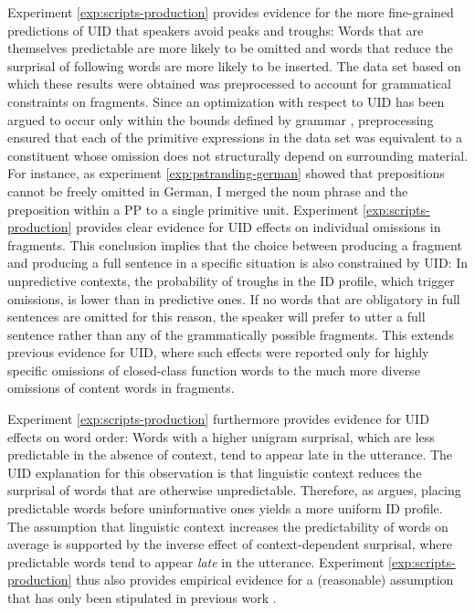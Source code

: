 Experiment \ref{exp:scripts-production} provides evidence for the more fine-grained predictions of UID that speakers avoid peaks and troughs: Words that are themselves predictable are more likely to be omitted and words that reduce the surprisal of following words are more likely to be inserted. The data set based on which these results were obtained was preprocessed to account for grammatical constraints on fragments. Since an optimization with respect to UID has been argued to occur only within the bounds defined by grammar \citep[25]{jaeger2010}, preprocessing ensured that each of the primitive expressions in the data set was equivalent to a constituent whose omission does not structurally depend on surrounding material. For instance, as experiment \ref{exp:pstranding-german} showed that prepositions cannot be freely omitted in German, I merged the noun phrase and the preposition within a PP to a single primitive unit. Experiment \ref{exp:scripts-production} provides clear evidence for UID effects on individual omissions in fragments. This conclusion implies that the choice between producing a fragment and producing a full sentence in a specific situation is also constrained by UID: In unpredictive contexts, the probability of troughs in the ID profile, which trigger omissions, is lower than in predictive ones. If no words that are obligatory in full sentences are omitted for this reason, the speaker will prefer to utter a full sentence rather than any of the grammatically possible fragments. This extends previous evidence for UID, where such effects were reported only for highly specific omissions of closed-class function words to the much more diverse omissions of content words in fragments.

Experiment \ref{exp:scripts-production} furthermore provides evidence for UID effects on word order: Words with a higher unigram surprisal, which are less predictable in the absence of context, tend to appear late in the utterance. The UID explanation for this observation is that linguistic context reduces the surprisal of words that are otherwise unpredictable. Therefore, as \citet{fenk-oczlon1983} argues, placing predictable words before uninformative ones yields a more uniform ID profile. The assumption that linguistic context increases the predictability of words on average is supported by the inverse effect of context-depen\-dent surprisal, where predictable words tend to appear \textit{late} in the utterance. Experiment \ref{exp:scripts-production} thus also provides empirical evidence for a (reasonable) assumption that has only been stipulated in previous work \citep{fenk-oczlon1983, fenk-oczlon1989, genzel.charniak2002}.


